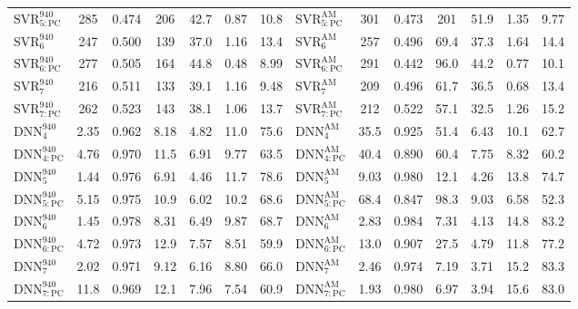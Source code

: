 \documentclass[a4paper,fleqn]{cas-sc}
\begin{document}
\begin{table}[<options>]
\begin{tabular*}{\tblwidth}{@{}LCCCCCCLCCCCCC@{}}
$\mathrm{SVR}^{940}_{5:\mathrm{PC}}$&285&0.474&206&42.7&0.87&10.8&$\mathrm{SVR}^\mathrm{AM}_{5:\mathrm{PC}}$&301&0.473&201&51.9&1.35&9.77\\
$\mathrm{SVR}^{940}_{6}$&247&0.500&139&37.0&1.16&13.4&$\mathrm{SVR}^\mathrm{AM}_{6}$&257&0.496&69.4&37.3&1.64&14.4\\
$\mathrm{SVR}^{940}_{6:\mathrm{PC}}$&277&0.505&164&44.8&0.48&8.99&$\mathrm{SVR}^\mathrm{AM}_{6:\mathrm{PC}}$&291&0.442&96.0&44.2&0.77&10.1\\
$\mathrm{SVR}^{940}_{7}$&216&0.511&133&39.1&1.16&9.48&$\mathrm{SVR}^\mathrm{AM}_{7}$&209&0.496&61.7&36.5&0.68&13.4\\
$\mathrm{SVR}^{940}_{7:\mathrm{PC}}$&262&0.523&143&38.1&1.06&13.7&$\mathrm{SVR}^\mathrm{AM}_{7:\mathrm{PC}}$&212&0.522&57.1&32.5&1.26&15.2\\
$\mathrm{DNN}^{940}_{4}$&2.35&0.962&8.18&4.82&11.0&75.6&$\mathrm{DNN}^\mathrm{AM}_{4}$&35.5&0.925&51.4&6.43&10.1&62.7\\
$\mathrm{DNN}^{940}_{4:\mathrm{PC}}$&4.76&0.970&11.5&6.91&9.77&63.5&$\mathrm{DNN}^\mathrm{AM}_{4:\mathrm{PC}}$&40.4&0.890&60.4&7.75&8.32&60.2\\
$\mathrm{DNN}^{940}_{5}$&1.44&0.976&6.91&4.46&11.7&78.6&$\mathrm{DNN}^\mathrm{AM}_{5}$&9.03&0.980&12.1&4.26&13.8&74.7\\
$\mathrm{DNN}^{940}_{5:\mathrm{PC}}$&5.15&0.975&10.9&6.02&10.2&68.6&$\mathrm{DNN}^\mathrm{AM}_{5:\mathrm{PC}}$&68.4&0.847&98.3&9.03&6.58&52.3\\
$\mathrm{DNN}^{940}_{6}$&1.45&0.978&8.31&6.49&9.87&68.7&$\mathrm{DNN}^\mathrm{AM}_{6}$&2.83&0.984&7.31&4.13&14.8&83.2\\
$\mathrm{DNN}^{940}_{6:\mathrm{PC}}$&4.72&0.973&12.9&7.57&8.51&59.9&$\mathrm{DNN}^\mathrm{AM}_{6:\mathrm{PC}}$&13.0&0.907&27.5&4.79&11.8&77.2\\
$\mathrm{DNN}^{940}_{7}$&2.02&0.971&9.12&6.16&8.80&66.0&$\mathrm{DNN}^\mathrm{AM}_{7}$&2.46&0.974&7.19&3.71&15.2&83.3\\
$\mathrm{DNN}^{940}_{7:\mathrm{PC}}$&11.8&0.969&12.1&7.96&7.54&60.9&$\mathrm{DNN}^\mathrm{AM}_{7:\mathrm{PC}}$&1.93&0.980&6.97&3.94&15.6&83.0\\
\bottomrule
\end{tabular*}
\end{table}
\end{document}
